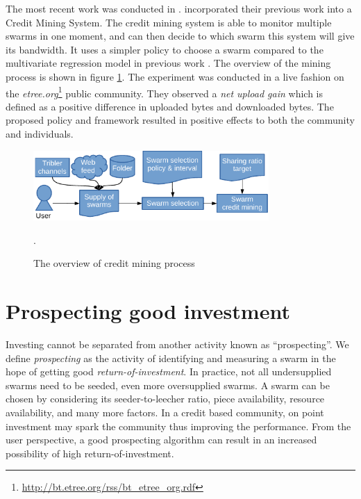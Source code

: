 The most recent work was conducted in \citeyear{2015:creditmining:capota} \cite{2015:creditmining:capota}. \citeauthor{2015:creditmining:capota} incorporated their previous work into a Credit Mining System. The credit mining system is able to monitor multiple swarms in one moment, and can then decide to which swarm this system will give its bandwidth. It uses a simpler policy to choose a swarm compared to the multivariate regression model in previous work \cite{2013:investmentcm:capota}. The overview of the mining process is shown in figure \ref{fig:cm15}. The experiment was conducted in a live fashion on the \textit{etree.org}\footnote{\url{http://bt.etree.org/rss/bt\_etree\_org.rdf}} public community. They observed a \textit{net upload gain} which is defined as a positive difference in uploaded bytes and downloaded bytes. The proposed policy and framework resulted in positive effects to both the community and individuals.

\begin{figure}[ht]
	\centering
	\includegraphics[width=0.8\textwidth]{pics/creditmining2015.pdf}
	\caption{The overview of credit mining process \cite{2015:creditmining:capota}}.
	\label{fig:cm15}
\end{figure}


\section{Prospecting good investment}

Investing cannot be separated from another activity known as ``prospecting''. We define \textit{prospecting} as the activity of identifying and measuring a swarm in the hope of getting good \textit{return-of-investment}. In practice, not all undersupplied swarms need to be seeded, even more oversupplied swarms. A swarm can be chosen by considering its seeder-to-leecher ratio, piece availability, resource availability, and many more factors. In a credit based community, on point investment may spark the community thus improving the performance. From the user perspective, a good prospecting algorithm can result in an increased possibility of high return-of-investment.

